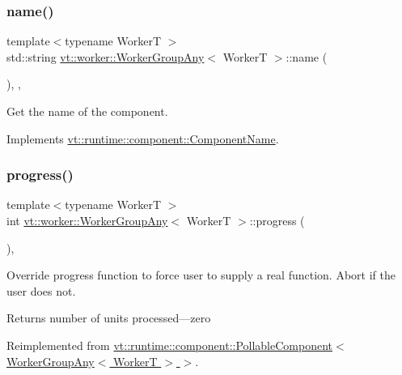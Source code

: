 \subsubsection{\texorpdfstring{name()}{name()}}
{\footnotesize\ttfamily template$<$typename WorkerT $>$ \\
std\+::string \hyperlink{structvt_1_1worker_1_1_worker_group_any}{vt\+::worker\+::\+Worker\+Group\+Any}$<$ WorkerT $>$\+::name (\begin{DoxyParamCaption}{ }\end{DoxyParamCaption})\hspace{0.3cm}{\ttfamily [inline]}, {\ttfamily [override]}, {\ttfamily [virtual]}}



Get the name of the component. 



Implements \hyperlink{structvt_1_1runtime_1_1component_1_1_component_name_a33c06229bb605a2b2ceff68830d6d773}{vt\+::runtime\+::component\+::\+Component\+Name}.

\mbox{\label{structvt_1_1worker_1_1_worker_group_any_a1a2d6dc321514501e00c0373f2583146}} 
\subsubsection{\texorpdfstring{progress()}{progress()}}
{\footnotesize\ttfamily template$<$typename WorkerT $>$ \\
int \hyperlink{structvt_1_1worker_1_1_worker_group_any}{vt\+::worker\+::\+Worker\+Group\+Any}$<$ WorkerT $>$\+::progress (\begin{DoxyParamCaption}{ }\end{DoxyParamCaption})\hspace{0.3cm}{\ttfamily [override]}, {\ttfamily [virtual]}}



Override progress function to force user to supply a real function. Abort if the user does not. 

\begin{DoxyReturn}{Returns}
number of units processed---zero 
\end{DoxyReturn}


Reimplemented from \hyperlink{structvt_1_1runtime_1_1component_1_1_pollable_component_a34cad810026224d550cd9b0c9d1eff22}{vt\+::runtime\+::component\+::\+Pollable\+Component$<$ Worker\+Group\+Any$<$ Worker\+T $>$ $>$}.

